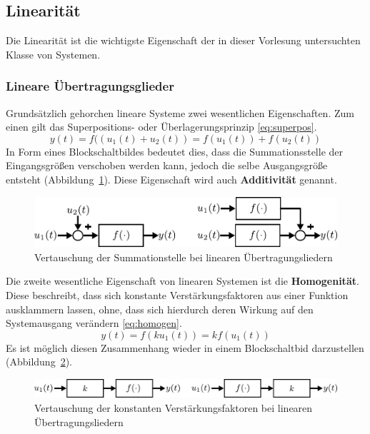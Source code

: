\subsection{Linearität}
%
Die Linearität ist die wichtigste Eigenschaft der in dieser Vorlesung untersuchten Klasse von Systemen. 
%
\subsubsection{Lineare Übertragungsglieder}
%
Grundsätzlich gehorchen lineare Systeme zwei wesentlichen Eigenschaften. Zum einen gilt das Superpositions- oder Überlagerungsprinzip \eqref{eq:superpos}.
%
\begin{equation}
y(t) = f((u_{1}(t)+u_{2}(t))=f(u_{1}(t))+f(u_{2}(t))\label{eq:superpos}
\end{equation}
%
In Form eines Blockschaltbildes bedeutet dies, dass die Summationsstelle der Eingangsgrößen verschoben werden kann, jedoch die selbe Ausgangsgröße entsteht (Abbildung~\ref{fig:blockschaltbildsumme}). Diese Eigenschaft wird auch \textbf{Additivität} genannt. 
%
\begin{figure}[h]
	\centering
	\includegraphics[width=0.8\linewidth]{Abbildungen/Modellbildung/PDF/Summation_Linearitaet.pdf}
	\caption{Vertauschung der Summationstelle bei linearen Übertragungsliedern}
	\label{fig:blockschaltbildsumme}
\end{figure}
%
Die zweite wesentliche Eigenschaft von linearen Systemen ist die \textbf{Homogenität}. Diese beschreibt, dass sich konstante Verstärkungsfaktoren aus einer Funktion ausklammern lassen, ohne, dass sich hierdurch deren Wirkung auf den Systemausgang verändern \eqref{eq:homogen}. 
%
\begin{equation}
y(t) = f\left(ku_{1}(t)\right)=kf\left(u_{1}(t)\right)\label{eq:homogen}
\end{equation}
%
Es ist möglich diesen Zusammenhang wieder in einem Blockschaltbid darzustellen (Abbildung~\ref{fig:blockschaltbildhomogen}). 
%
\begin{figure}[h]
	\centering
	\includegraphics[width=0.9\linewidth]{Abbildungen/Modellbildung/PDF/Homogenitaet.pdf}
	\caption{Vertauschung der konstanten Verstärkungsfaktoren bei linearen Übertragungsliedern}
	\label{fig:blockschaltbildhomogen}
\end{figure}
